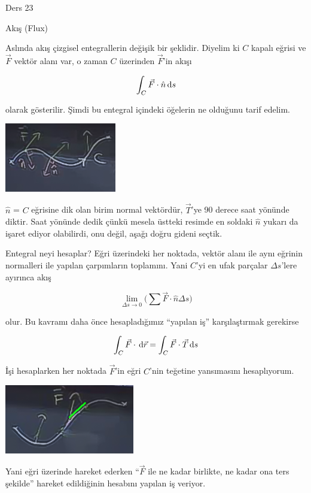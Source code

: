 \documentclass[12pt,fleqn]{article}\usepackage{../../common}
\begin{document}
Ders 23

Akış (Flux)

Aslında akış çizgisel entegrallerin değişik bir şeklidir. Diyelim ki $C$ kapalı
eğrisi ve $\vec{F}$ vektör alanı var, o zaman $C$ üzerinden $\vec{F}$'in akışı

$$ \int_C \vec{F} \cdot \hat{n} \,\mathrm{d} s $$

olarak gösterilir. Şimdi bu entegral içindeki öğelerin ne olduğunu tarif
edelim. 

\begin{center}
\includegraphics[height=3cm]{23_1.png}
\end{center}

$\hat{n}$ = $C$ eğrisine dik olan birim normal vektördür, $\vec{T}$'ye 90 derece
saat yönünde diktir. Saat yönünde dedik çünkü mesela üstteki resimde en soldaki
$\hat{n}$ yukarı da işaret ediyor olabilirdi, onu değil, aşağı doğru gideni
seçtik.

Entegral neyi hesaplar? Eğri üzerindeki her noktada, vektör alanı ile aynı
eğrinin normalleri ile yapılan çarpımların toplamını. Yani $C$'yi en ufak
parçalar $\Delta s$'lere ayırınca akış

$$
\lim_{\Delta s \to 0} 
\bigg( \sum \vec{F} \cdot \hat{n}  \Delta s \bigg)
$$

olur. Bu kavramı daha önce hesapladığımız ``yapılan iş'' karşılaştırmak
gerekirse


$$ \int_C \vec{F} \cdot \,\mathrm{d}\vec{r} = \int_C \vec{F} \cdot \vec{T} \,\mathrm{d} s $$

İşi hesaplarken her noktada $\vec{F}$'in eğri $C$'nin teğetine yansımasını
hesaplıyorum. 

\begin{center}
\includegraphics[height=3cm]{23_2.png}
\end{center}

Yani eğri üzerinde hareket ederken ``$\vec{F}$ ile ne kadar birlikte, ne
kadar ona ters şekilde'' hareket edildiğinin hesabını yapılan iş veriyor. 
\end{document}

